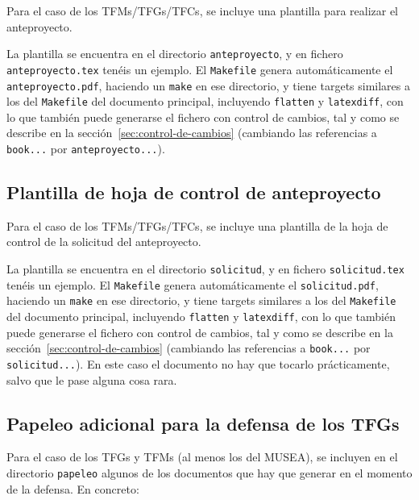 Para el caso de los TFMs/TFGs/TFCs, se incluye una plantilla para
realizar el anteproyecto.

La plantilla se encuentra en el directorio \texttt{anteproyecto}, y en
fichero \texttt{anteproyecto.tex} tenéis un ejemplo. El
\texttt{Makefile} genera automáticamente el \texttt{anteproyecto.pdf},
haciendo un \texttt{make} en ese directorio, y tiene targets similares a los
del \texttt{Makefile} del documento principal, incluyendo
\texttt{flatten} y \texttt{latexdiff}, con lo que también puede
generarse el fichero con control de cambios, tal y como se describe en
la sección~\ref{sec:control-de-cambios} (cambiando las referencias a
\texttt{book...} por \texttt{anteproyecto...}).

\subsection{Plantilla de hoja de control de anteproyecto}
\label{sec:plantilla-de-hoja-control-anteproyecto}

Para el caso de los TFMs/TFGs/TFCs, se incluye una plantilla de la hoja
de control de la solicitud del anteproyecto.

La plantilla se encuentra en el directorio \texttt{solicitud}, y en
fichero \texttt{solicitud.tex} tenéis un ejemplo. El
\texttt{Makefile} genera automáticamente el \texttt{solicitud.pdf},
haciendo un \texttt{make} en ese directorio, y tiene targets similares a los
del \texttt{Makefile} del documento principal, incluyendo
\texttt{flatten} y \texttt{latexdiff}, con lo que también puede
generarse el fichero con control de cambios, tal y como se describe en
la sección~\ref{sec:control-de-cambios} (cambiando las referencias a
\texttt{book...} por \texttt{solicitud...}). En este caso el documento
no hay que tocarlo prácticamente, salvo que le pase alguna cosa rara.


\subsection{Papeleo adicional para la defensa de los TFGs}
\label{sec:introapp1}

Para el caso de los TFGs y TFMs (al menos los del MUSEA), se incluyen en
el directorio \texttt{papeleo} algunos de los documentos que hay que
generar en el momento de la defensa. En concreto:

